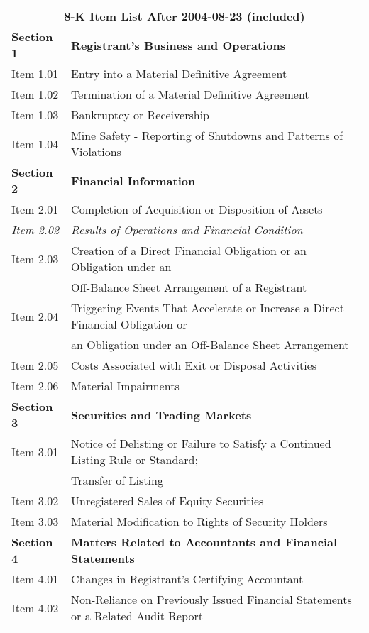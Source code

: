 \begin{table}[H]
	\begin{tabular}{ll}
    \multicolumn{2}{c}{\textbf{8-K Item List After 2004-08-23 (included)}} \\
    \textbf{Section 1} & \textbf{Registrant's Business and Operations} \\
    Item 1.01 & Entry into a Material Definitive Agreement \\
    Item 1.02 & Termination of a Material Definitive Agreement \\
    Item 1.03 & Bankruptcy or Receivership \\
    Item 1.04 & Mine Safety - Reporting of Shutdowns and Patterns of Violations \\
    \textbf{Section 2} & \textbf{Financial Information} \\
    Item 2.01 & Completion of Acquisition or Disposition of Assets \\
    \textit{Item 2.02} & \textit{Results of Operations and Financial Condition} \\
    Item 2.03 & Creation of a Direct Financial Obligation or an Obligation under an \\
              & Off-Balance Sheet Arrangement of a Registrant \\
    Item 2.04 & Triggering Events That Accelerate or Increase a Direct Financial Obligation or \\
              & an Obligation under an Off-Balance Sheet Arrangement \\
    Item 2.05 & Costs Associated with Exit or Disposal Activities \\
    Item 2.06 & Material Impairments \\
    \textbf{Section 3} & \textbf{Securities and Trading Markets} \\
    Item 3.01 & Notice of Delisting or Failure to Satisfy a Continued Listing Rule or Standard; \\
              & Transfer of Listing \\
    Item 3.02 & Unregistered Sales of Equity Securities \\
    Item 3.03 & Material Modification to Rights of Security Holders \\
    \textbf{Section 4} & \textbf{Matters Related to Accountants and Financial Statements} \\
    Item 4.01 & Changes in Registrant's Certifying Accountant \\
    Item 4.02 & Non-Reliance on Previously Issued Financial Statements or a Related Audit Report \\

\end{tabular}
\end{table}
